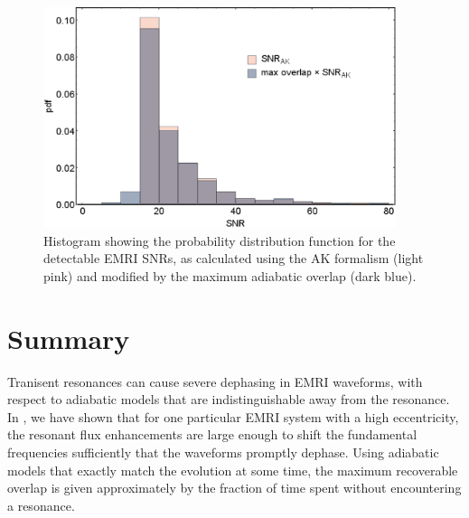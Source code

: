 

\begin{figure}[htbp]
\centering
\includegraphics[width=0.92\textwidth]{pop_SNR_dist}
\caption{\label{fig:pop-SNR-dist}Histogram showing the probability distribution function for the detectable EMRI SNRs, as calculated using the AK formalism (light pink) and modified by the maximum adiabatic overlap (dark blue).}
\end{figure}

\section{Summary}
Tranisent resonances can cause severe dephasing in EMRI waveforms, with respect to adiabatic models that are indistinguishable away from the resonance. In , we have shown that for one particular EMRI system with a high eccentricity, the resonant flux enhancements are large enough to shift the fundamental frequencies sufficiently that the waveforms promptly dephase. Using adiabatic models that exactly match the evolution at some time, the maximum recoverable overlap is given approximately by the fraction of time spent without encountering a resonance.

